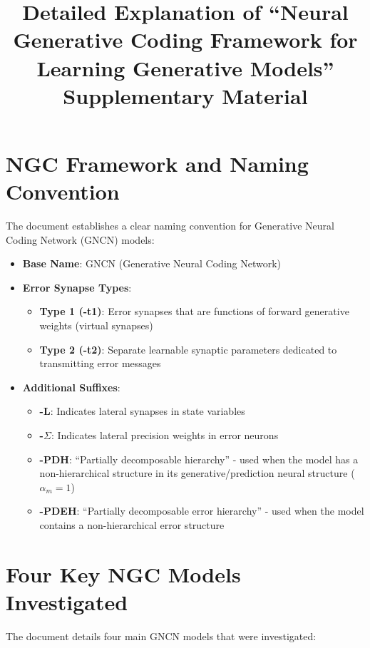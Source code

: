 \documentclass{article}
\title{Detailed Explanation of ``Neural Generative Coding Framework for Learning Generative Models'' Supplementary Material}
\author{}
\date{}
\begin{document}
\maketitle

\section{NGC Framework and Naming Convention}

The document establishes a clear naming convention for Generative Neural Coding Network (GNCN) models:

\begin{itemize}
  \item \textbf{Base Name}: GNCN (Generative Neural Coding Network)
  \item \textbf{Error Synapse Types}:
  \begin{itemize}
    \item \textbf{Type 1 (-t1)}: Error synapses that are functions of forward generative weights (virtual synapses)
    \item \textbf{Type 2 (-t2)}: Separate learnable synaptic parameters dedicated to transmitting error messages
  \end{itemize}

  \item \textbf{Additional Suffixes}:
  \begin{itemize}
    \item \textbf{-L}: Indicates lateral synapses in state variables
    \item \textbf{-$\Sigma$}: Indicates lateral precision weights in error neurons
    \item \textbf{-PDH}: ``Partially decomposable hierarchy'' - used when the model has a non-hierarchical structure in its generative/prediction neural structure ($\alpha_m = 1$)
    \item \textbf{-PDEH}: ``Partially decomposable error hierarchy'' - used when the model contains a non-hierarchical error structure
  \end{itemize}
\end{itemize}

\section{Four Key NGC Models Investigated}

The document details four main GNCN models that were investigated:
\end{document}
